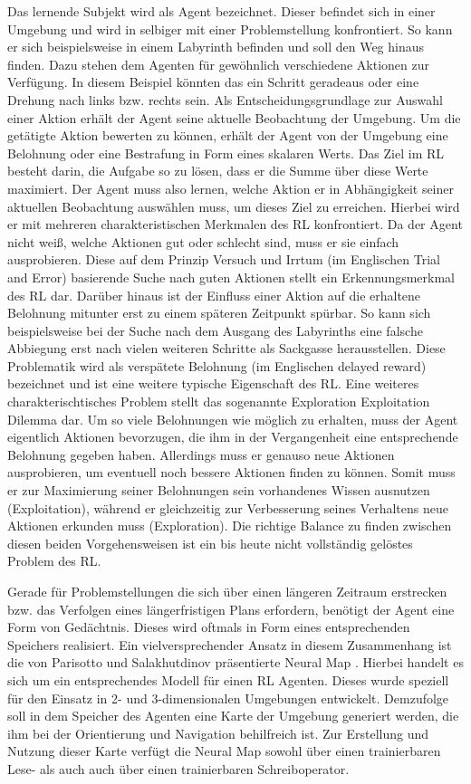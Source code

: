Das lernende Subjekt wird als Agent bezeichnet. Dieser befindet sich in einer Umgebung und wird in selbiger mit einer Problemstellung konfrontiert. So kann er sich beispielsweise in einem Labyrinth befinden und soll den Weg hinaus finden. Dazu stehen dem Agenten für gewöhnlich verschiedene Aktionen zur Verfügung. In diesem Beispiel könnten das ein Schritt geradeaus oder eine Drehung nach links bzw. rechts sein. Als Entscheidungsgrundlage zur Auswahl einer Aktion erhält der Agent seine aktuelle Beobachtung der Umgebung. Um die getätigte Aktion bewerten zu können, erhält der Agent von der Umgebung eine Belohnung oder eine Bestrafung in Form eines skalaren Werts. Das Ziel im \ac{RL} besteht darin, die Aufgabe so zu lösen, dass er die Summe über diese Werte maximiert. Der Agent muss also lernen, welche Aktion er in Abhängigkeit seiner aktuellen Beobachtung auswählen muss, um dieses Ziel zu erreichen. Hierbei wird er mit mehreren charakteristischen Merkmalen des \ac{RL} konfrontiert. Da der Agent nicht weiß, welche Aktionen gut oder schlecht sind, muss er sie einfach ausprobieren. Diese auf dem Prinzip Versuch und Irrtum (im Englischen Trial and Error) basierende Suche nach guten Aktionen stellt ein Erkennungsmerkmal des \ac{RL} dar. Darüber hinaus ist der Einfluss einer Aktion auf die erhaltene Belohnung mitunter erst zu einem späteren Zeitpunkt spürbar. So kann sich beispielsweise bei der Suche nach dem Ausgang des Labyrinths eine falsche Abbiegung erst nach vielen weiteren Schritte als Sackgasse herausstellen. Diese Problematik wird als verspätete Belohnung (im Englischen delayed reward) bezeichnet und ist eine weitere typische Eigenschaft des \ac{RL}. Eine weiteres charakterischtisches Problem stellt das sogenannte Exploration Exploitation Dilemma dar. Um so viele Belohnungen wie möglich zu erhalten, muss der Agent eigentlich Aktionen bevorzugen, die ihm in der Vergangenheit eine entsprechende Belohnung gegeben haben. Allerdings muss er genauso neue Aktionen ausprobieren, um eventuell noch bessere Aktionen finden zu können. Somit muss er zur Maximierung seiner Belohnungen sein vorhandenes Wissen ausnutzen (Exploitation), während er gleichzeitig zur Verbesserung seines Verhaltens neue Aktionen erkunden muss (Exploration). Die richtige Balance zu finden zwischen diesen beiden Vorgehensweisen ist ein bis heute nicht vollständig gelöstes Problem des \ac{RL}.

Gerade für Problemstellungen die sich über einen längeren Zeitraum erstrecken bzw. das Verfolgen eines längerfristigen Plans erfordern, benötigt der Agent eine Form von Gedächtnis. Dieses wird oftmals in Form eines entsprechenden Speichers realisiert. Ein vielversprechender Ansatz in diesem Zusammenhang ist die von Parisotto und Salakhutdinov präsentierte Neural Map \cite{NeuralMap}. Hierbei handelt es sich um ein entsprechendes Modell für einen \ac{RL} Agenten. Dieses wurde speziell für den Einsatz in 2- und 3-dimensionalen Umgebungen entwickelt. Demzufolge soll in dem Speicher des Agenten eine Karte der Umgebung generiert werden, die ihm bei der Orientierung und Navigation behilfreich ist. Zur Erstellung und Nutzung dieser Karte verfügt die Neural Map sowohl über einen trainierbaren Lese- als auch auch über einen trainierbaren Schreiboperator.

